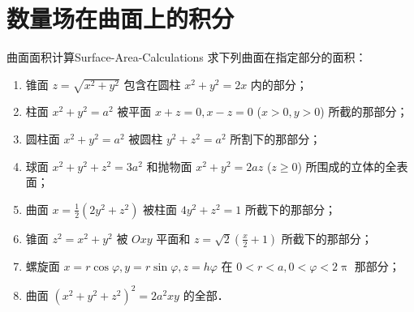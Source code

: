 \section{数量场在曲面上的积分}

\begin{problem}{曲面面积计算}{Surface-Area-Calculations}
    求下列曲面在指定部分的面积：
    \begin{enumerate}
        \item 锥面 $z = \sqrt{x^2 + y^2}$ 包含在圆柱 $x^2 + y^2 = 2x$ 内的部分；
        \item 柱面 $x^2 + y^2 = a^2$ 被平面 $x + z = 0, x - z = 0$ ($x > 0, y > 0$) 所截的那部分；
        \item 圆柱面 $x^2 + y^2 = a^2$ 被圆柱 $y^2 + z^2 = a^2$ 所割下的那部分；
        \item 球面 $x^2 + y^2 + z^2 = 3a^2$ 和抛物面 $x^2 + y^2 = 2az$ ($z \ge 0$) 所围成的立体的全表面；
        \item 曲面 $x = \frac{1}{2}(2y^2 + z^2)$ 被柱面 $4y^2 + z^2 = 1$ 所截下的那部分；
        \item 锥面 $z^2 = x^2 + y^2$ 被 $Oxy$ 平面和 $z = \sqrt{2} \left( \frac{x}{2} + 1 \right)$ 所截下的那部分；
        \item 螺旋面 $x = r \cos \varphi, y = r \sin \varphi, z = h \varphi$ 在 $0 < r < a, 0 < \varphi < 2\uppi$ 那部分；
        \item 曲面 $(x^2 + y^2 + z^2)^2 = 2a^2 xy$ 的全部．
    \end{enumerate}
\end{problem}

